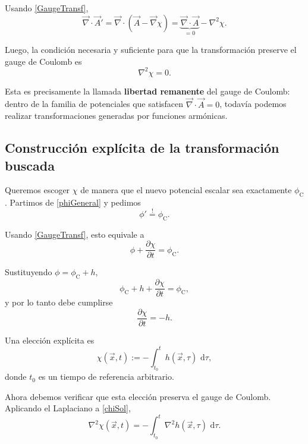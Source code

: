 \documentclass{article}
\numberwithin{equation}{section}
\newcommand{\dd}{\,\mathrm{d}}
\newcommand{\grad}{\vec\nabla}
\newcommand{\A}{\vec A}
\newcommand{\x}{\vec x}
\begin{document}
Usando \eqref{GaugeTransf},
\begin{equation}
\grad\cdot\A' = \grad\cdot(\A-\grad\chi)=\underbrace{\grad\cdot\A}_{=0}-\nabla^2\chi.
\end{equation}

Luego, la condición necesaria y suficiente para que la transformación preserve el gauge de Coulomb es
\begin{equation}\label{chiHarmonic}
\nabla^2\chi=0.
\end{equation}

Esta es precisamente la llamada \textbf{libertad remanente} del gauge de Coulomb: dentro de la familia de potenciales que satisfacen $\grad\cdot\A=0$, todavía podemos realizar transformaciones generadas por funciones armónicas.

\subsection{Construcción explícita de la transformación buscada}

Queremos escoger $\chi$ de manera que el nuevo potencial escalar sea exactamente $\phi_{\mathrm C}$. Partimos de \eqref{phiGeneral} y pedimos
\begin{equation}
\phi'\stackrel{!}{=}\phi_{\mathrm C}.
\end{equation}

Usando \eqref{GaugeTransf}, esto equivale a
\begin{equation}
\phi+\frac{\partial\chi}{\partial t}=\phi_{\mathrm C}.
\end{equation}

Sustituyendo $\phi=\phi_{\mathrm C}+h$,
\begin{equation}
\phi_{\mathrm C}+h+\frac{\partial\chi}{\partial t}=\phi_{\mathrm C},
\end{equation}
y por lo tanto debe cumplirse
\begin{equation}\label{dchi}
\frac{\partial\chi}{\partial t}=-h.
\end{equation}

Una elección explícita es
\begin{equation}\label{chiSol}
\chi(\x,t):=-\int_{t_0}^{t} h(\x,\tau)\,\dd\tau,
\end{equation}
donde $t_0$ es un tiempo de referencia arbitrario.

Ahora debemos verificar que esta elección preserva el gauge de Coulomb. Aplicando el Laplaciano a \eqref{chiSol},
\begin{equation}
\nabla^2\chi(\x,t)=-\int_{t_0}^{t} \nabla^2 h(\x,\tau)\,\dd\tau.
\end{equation}
\end{document}
